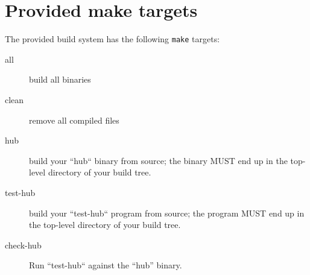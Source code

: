\documentclass{article}
\begin{document}
\section{Provided make targets}

The provided build system has the following {\tt make} targets:

\begin{description}
\item[all] build all binaries
\item[clean] remove all compiled files
\item[hub] build your ``hub`` binary from source; the binary MUST end up in the top-level directory of your build tree.
\item[test-hub] build your ``test-hub`` program from source; the program MUST end up in the top-level directory of your build tree.
\item[check-hub] Run ``test-hub`` against the ``hub'' binary.
\end{description}
\end{document}
